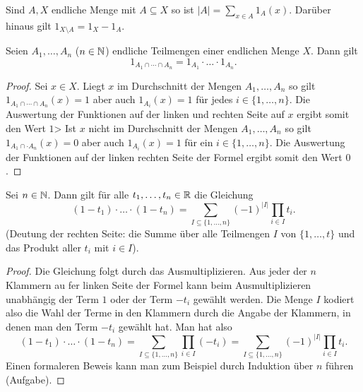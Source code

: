 \begin{bem}
	Sind $A, X$ endliche Menge mit $A \subseteq X$ so ist $|A| = \sum_{x \in A} 1_A(x)$. Darüber hinaus gilt $1_{X \setminus A} = 1_X - 1_A$. 
\end{bem}

\begin{lem}
	Seien $A_1,\ldots,A_n$ ($n \in \mathbb{N}$) endliche Teilmengen einer endlichen Menge $X$. Dann gilt 
	\[
			1_{A_1 \cap \cdots \cap A_n}  = 1_{A_1} \cdot \ldots \cdot 1_{A_n}. 
	\]
\end{lem} 
\begin{proof}
	Sei $x \in X$. 
	Liegt $x$ im Durchschnitt der Mengen $A_1,\ldots,A_n$ so gilt $1_{A_1 \cap \cdots \cap A_n} (x) =1$  aber auch $1_{A_i}(x)=1$ für jedes $i \in \{1,\ldots,n\}$. Die Auswertung der Funktionen auf der linken und rechten Seite auf $x$  ergibt somit den Wert $1$> 
	Ist $x$ nicht im Durchschnitt der Mengen $A_1,\ldots,A_n$ so gilt $1_{A_1 \cap \cdot A_n}(x) =0$ aber auch $1_{A_i}(x)=1$ für ein $i \in \{1,\ldots,n\}$. Die Auswertung der Funktionen auf der linken rechten Seite der Formel ergibt somit den Wert $0$. 
\end{proof} 

\begin{lem} \label{lem:product} 
	Sei $n \in \mathbb{N}$. Dann gilt für alle $t_1,\ldots,t_n \in \mathbb{R}$ die Gleichung 
	\[
		(1 - t_1) \cdot \ldots \cdot  (1-t_n) = \sum_{I \subseteq \{1,\ldots,n\}} (-1)^{|I|} \prod_{i \in I} t_i.  
	\]
	(Deutung der rechten Seite: die Summe über alle Teilmengen $I$ von $\{1,\ldots,t\}$ und das Produkt aller $t_i$ mit $i \in I$). 
\end{lem} 
\begin{proof} 
	Die Gleichung folgt durch das Ausmultiplizieren. Aus jeder der $n$ Klammern au fer linken Seite der Formel kann  beim Ausmultiplizieren unabhängig der Term $1$ oder der Term $-t_i$ gewählt werden. Die Menge $I$ kodiert also die Wahl der Terme in den Klammern durch die Angabe der Klammern, in denen man den Term $-t_i$ gewählt hat. Man hat also 
	\[
			(1 - t_1) \cdot \ldots \cdot  (1-t_n) = \sum_{I \subseteq \{1,\ldots,n\}}  \prod_{i \in I} (-t_i)  = \sum_{I \subseteq \{1,\ldots,n\}} (-1)^{|I|} \prod_{i \in I} t_i.
	\]
	Einen formaleren Beweis kann man zum Beispiel durch Induktion über $n$ führen (Aufgabe). 
\end{proof} 

